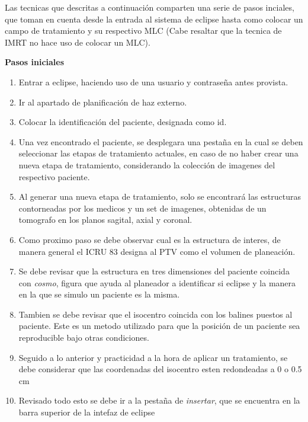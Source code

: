 \documentclass{article}
\begin{document}
\begin{tcolorbox}[colback= pastelgreen, colframe= lincolngreen, title={Consideraciones iniciales}, center title]
    
    Las tecnicas que descritas a continuación comparten una serie de pasos inciales, que toman en cuenta desde la entrada al sistema de eclipse hasta como colocar un campo de tratamiento y su respectivo MLC (Cabe resaltar que la tecnica de IMRT no hace uso de colocar un MLC).

    \vspace{10pt}

    \textbf{Pasos iniciales}
    \begin{enumerate}
        \item Entrar a eclipse, haciendo uso de una usuario y contraseña antes provista.
        \item Ir al apartado de planificación de haz externo.
        \item Colocar la identificación del paciente, designada como id.
        \item Una vez encontrado el paciente, se desplegara una pestaña en la cual se deben seleccionar las etapas de tratamiento actuales, en caso de no haber crear una nueva etapa de tratamiento, considerando la colección de imagenes del respectivo paciente.
        \item Al generar una nueva etapa de tratamiento, solo se encontrará las estructuras contorneadas por los medicos y un set de imagenes, obtenidas de un tomografo en los planos sagital, axial y coronal.
        \item Como proximo paso se debe observar cual es la estructura de interes, de manera general el ICRU 83 designa al PTV como el volumen de planeación. 
        \item Se debe revisar que la estructura en tres dimensiones del paciente coincida con \textit{cosmo}, figura que ayuda al planeador a identificar si eclipse y la manera en la que se simulo un paciente es la misma. 
        \item Tambien se debe revisar que el isocentro coincida con los balines puestos al paciente. Este es un metodo utilizado para que la posición de un paciente sea reproducible bajo otras condiciones.
        \item Seguido a lo anterior y practicidad a la hora de aplicar un tratamiento, se debe considerar que las coordenadas del isocentro esten redondeadas a 0 o 0.5 cm
        \item Revisado todo esto se debe ir a la pestaña de \textit{insertar}, que se encuentra en la barra superior de la intefaz de eclipse

\end{enumerate}
\end{tcolorbox}
\end{document}
